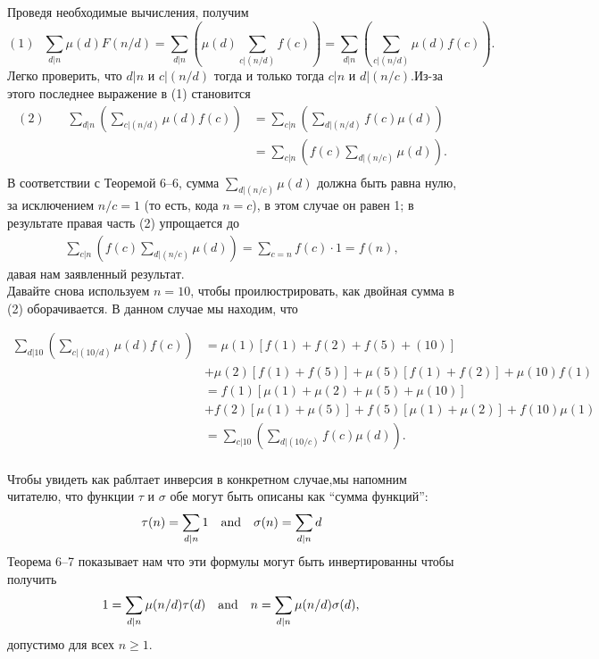 \documentclass[11pt]{article}
\begin{document}
Проведя необходимые вычисления, получим\\

$$
(1)~~~\sum_{d|n}\mu(d)F(n/d)=\sum_{d|n}\left(\mu(d)\sum_{c|(n/d)}f(c)\right)=\sum_{d|n}\left(\sum_{c|(n/d)}\mu(d)f(c)\right).
$$
Легко проверить, что  $d|n$ и $c|(n/d)$ тогда и только тогда $c|n$ и $d|(n/c)$.Из-за этого последнее выражение в (1) становится\\
\begin{align*}
(2)~~~~~~~~\sum_{d|n}\left(\sum_{c|(n/d)}\mu(d)f(c)\right)&=
\sum_{c|n}\left(\sum_{d|(n/d)}f(c)\mu(d)\right)\\
&=\sum_{c|n}\left(f(c)\sum_{d|(n/c)}\mu(d)\right).\\
\end{align*}
В соответствии с Теоремой 6--6, сумма $\sum_{d|(n/c)}\mu(d)$ должна быть равна нулю, за исключением $n/c=1$ (то есть, кода $n=c$), в этом случае он равен 1; в результате правая часть (2) упрощается до \\
\begin{align*}
\sum_{c|n}\left(f(c)\sum_{d|(n/c)}\mu(d)\right)=\sum_{c=n}f(c)\cdot 1=f(n),
\end{align*}
давая нам заявленный результат.\\

Давайте снова используем $n=10$, чтобы проилюстрировать, как двойная сумма в (2) оборачивается. В данном случае мы находим, что

\begin{align*}
\sum_{d|10}\left(\sum_{c|(10/d)}\mu(d)f(c)\right)&=
\mu(1)[f(1)+f(2)+f(5)+(10)]\\
&+\mu(2)[f(1)+f(5)]+\mu(5)[f(1)+f(2)]+\mu(10)f(1)\\
&=f(1)[\mu(1)+\mu(2)+\mu(5)+\mu(10)]\\
&+f(2)[\mu(1)+\mu(5)]+f(5)[\mu(1)+\mu(2)]+f(10)\mu(1)\\
&=\sum_{c|10}\left(\sum_{d|(10/c)}f(c)\mu(d)\right).\\
\end{align*}

Чтобы увидеть как раблтает инверсия в конкретном случае,мы напомним читателю, что функции $\tau$ и $\sigma$ обе могут быть описаны как ``сумма функций'':\\
$$\tau(n) = \sum \limits_{d\mid n} 1
\text{\quad and\quad}
\sigma(n) =\sum \limits_{d\mid n} d$$
Теорема 6--7 показывает нам что эти формулы могут быть инвертированны чтобы получить\\
$$
1=\sum_{d|n}\mu(n/d)\tau(d)
\text{\quad and\quad} 
n=\sum_{d|n}\mu(n/d)\sigma(d),\\
$$
допустимо для всех $n\ge1$.\\
\end{document}
